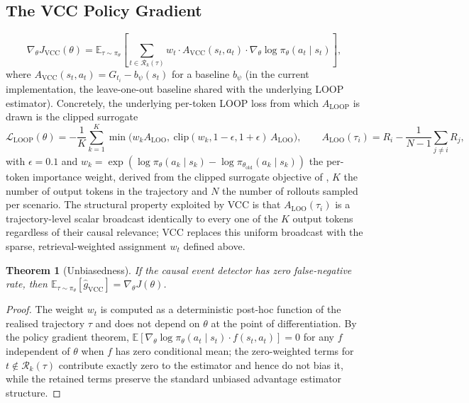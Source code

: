 \documentclass[11pt]{article}
\newtheorem{theorem}{Theorem}
\begin{document}
\subsection{The VCC Policy Gradient}

\begin{equation}
\nabla_\theta J_{\mathrm{VCC}}(\theta) = \mathbb{E}_{\tau \sim \pi_\theta}\left[
\sum_{t \in \mathcal{R}_k(\tau)} w_t \cdot A_{\mathrm{VCC}}(s_t, a_t) \cdot \nabla_\theta \log \pi_\theta(a_t \mid s_t)
\right],
\end{equation}
where $A_{\mathrm{VCC}}(s_t, a_t) = G_{t_i} - b_\psi(s_t)$ for a baseline
$b_\psi$ (in the current implementation, the leave-one-out baseline shared
with the underlying LOOP estimator). Concretely, the underlying per-token
LOOP loss from which $A_{\mathrm{LOOP}}$ is drawn is the clipped surrogate
\begin{equation}
\mathcal{L}_{\mathrm{LOOP}}(\theta) = -\frac{1}{K}\sum_{k=1}^{K}
\min\!\big(w_k A_{\mathrm{LOO}},\ \mathrm{clip}(w_k, 1-\epsilon, 1+\epsilon)\, A_{\mathrm{LOO}}\big),
\qquad
A_{\mathrm{LOO}}(\tau_i) = R_i - \frac{1}{N-1}\sum_{j \neq i} R_j,
\end{equation}
with $\epsilon = 0.1$ and $w_k = \exp(\log \pi_\theta(a_k\mid s_k) - \log \pi_{\theta_{\mathrm{old}}}(a_k\mid s_k))$
the per-token importance weight, derived from the clipped surrogate
objective of \cite{ppo2017}, $K$ the number of output tokens in the
trajectory and $N$ the number of rollouts sampled per scenario. The structural
property exploited by VCC is that $A_{\mathrm{LOO}}(\tau_i)$ is a
trajectory-level scalar broadcast identically to every one of the $K$ output
tokens regardless of their causal relevance; VCC replaces this uniform
broadcast with the sparse, retrieval-weighted assignment $w_t$ defined above.

\begin{theorem}[Unbiasedness]
\label{thm:unbiased}
If the causal event detector has zero false-negative rate, then
$\mathbb{E}_{\tau \sim \pi_\theta}[\hat{g}_{\mathrm{VCC}}] = \nabla_\theta J(\theta)$.
\end{theorem}

\begin{proof}
The weight $w_t$ is computed as a deterministic post-hoc function of the
realised trajectory $\tau$ and does not depend on $\theta$ at the point of
differentiation. By the policy gradient theorem,
$\mathbb{E}[\nabla_\theta \log \pi_\theta(a_t\mid s_t) \cdot f(s_t,a_t)] = 0$
for any $f$ independent of $\theta$ when $f$ has zero conditional mean; the
zero-weighted terms for $t \notin \mathcal{R}_k(\tau)$ contribute exactly zero
to the estimator and hence do not bias it, while the retained terms preserve
the standard unbiased advantage estimator structure.
\end{proof}
\end{document}
